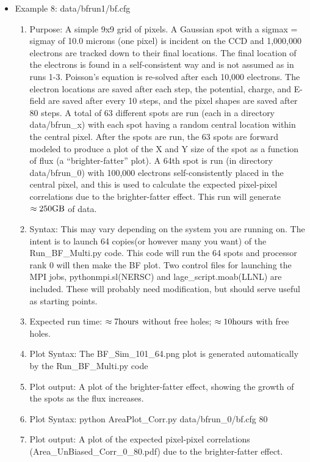 \documentclass{article} %
\begin{document}
\begin{itemize}
      \item Example 8: data/bfrun1/bf.cfg
    \begin{enumerate}
      \item Purpose: A simple 9x9 grid of pixels.  A Gaussian spot with a sigmax = sigmay of 10.0 microns (one pixel) is incident on the CCD and 1,000,000 electrons are tracked down to their final locations. The final location of the electrons is found in a self-consistent way and is not assumed as in runs 1-3.  Poisson's equation is re-solved after each 10,000 electrons.  The electron locations are saved after each step, the potential, charge, and E-field are saved after every 10 steps, and the pixel shapes are saved after 80 steps. A total of 63 different spots are run (each in a directory data/bfrun\_x) with each spot having a random central location within the central pixel.  After the spots are run, the 63 spots are forward modeled to produce a plot of the X and Y size of the spot as a function of flux (a ``brighter-fatter'' plot). A 64th spot is run (in directory data/bfrun\_0) with 100,000 electrons self-consistently placed in the central pixel, and this is used to calculate the expected pixel-pixel correlations due to the brighter-fatter effect.  This run will generate $\rm \approx 250 GB$ of data.
      \item Syntax: This may vary depending on the system you are running on.  The intent is to launch 64 copies(or however many you want) of the Run\_BF\_Multi.py code.  This code will run the 64 spots and processor rank 0 will then make the BF plot. Two control files for launching the MPI jobs, pythonmpi.sl(NERSC) and lage\_script.moab(LLNL) are included.  These will probably need modification, but should serve useful as starting points.
      \item Expected run time: $\rm \approx 7 hours$ without free holes;  $\rm \approx 10 hours$ with free holes.
      \item Plot Syntax: The BF\_Sim\_101\_64.png plot is generated automatically by the Run\_BF\_Multi.py code
      \item Plot output: A plot of the brighter-fatter effect, showing the growth of the spots as the flux increases.
      \item Plot Syntax: python AreaPlot\_Corr.py data/bfrun\_0/bf.cfg 80
      \item Plot output: A plot of the expected pixel-pixel correlations (Area\_UnBiased\_Corr\_0\_80.pdf) due to the brighter-fatter effect.
    \end{enumerate}


\end{itemize}
\end{document}
